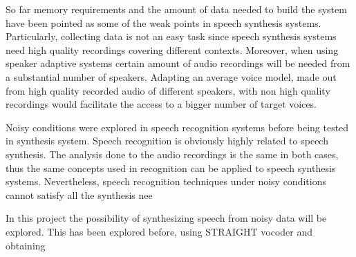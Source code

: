 So far memory requirements and the amount of data needed to build the system have been pointed as some of the weak points in speech synthesis systems. Particularly, collecting data is not an easy task since speech synthesis systems need high quality recordings covering different contexts. Moreover, when using speaker adaptive systems certain amount of audio recordings will be needed from a substantial number of speakers. Adapting an average voice model, made out from high quality recorded audio of different speakers, with non high quality recordings would facilitate the access to a bigger number of target voices.

Noisy conditions were explored in speech recognition systems before being tested in synthesis system. Speech recognition is obviously highly related to speech synthesis. The analysis done to the audio recordings is the same in both cases, thus the same concepts used in recognition can be applied to speech synthesis systems. Nevertheless, speech recognition techniques under noisy conditions cannot satisfy all the synthesis nee

In this project the possibility of synthesizing speech from noisy data will be explored. This has been explored before, using STRAIGHT vocoder and obtaining 
